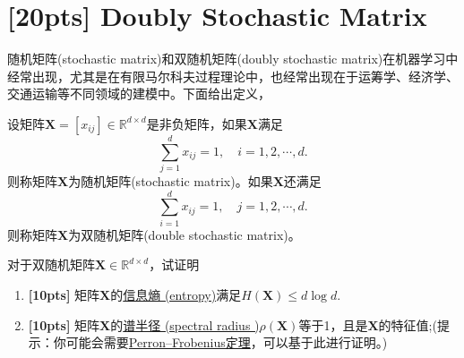 \documentclass[a4paper,UTF8]{article}
\numberwithin{equation}{section}
\begin{document}
\section{[20pts] Doubly Stochastic Matrix}
随机矩阵(stochastic matrix)和双随机矩阵(doubly stochastic matrix)在机器学习中经常出现，尤其是在有限马尔科夫过程理论中，也经常出现在于运筹学、经济学、交通运输等不同领域的建模中。下面给出定义，
\begin{def-box}[随机矩阵]
设矩阵$\mathbf{X}=[x_{ij}]\in \mathbb{R}^{d\times d}$是非负矩阵，如果$\mathbf{X}$满足
\begin{equation}
	\label{eq-sto-matrix}
	\sum_{j=1}^d x_{ij} = 1,\quad i=1,2,\cdots,d.
\end{equation}
则称矩阵$\mathbf{X}$为随机矩阵(stochastic matrix)。如果$\mathbf{X}$还满足
\begin{equation}
	\label{eq-double-sto-matrix}
	\sum_{i=1}^d x_{ij} = 1,\quad j=1,2,\cdots,d.
\end{equation}
则称矩阵$\mathbf{X}$为双随机矩阵(double stochastic matrix)。
\end{def-box}
对于双随机矩阵$\mathbf{X} \in \mathbb{R}^{d\times d}$，试证明
\begin{enumerate}[ {(}1{)}]
\item \textbf{[10pts]} 矩阵$\mathbf{X}$的\href{https://en.wikipedia.org/wiki/Entropy_(information_theory)}{信息熵 (entropy)}满足$H(\mathbf{X}) \leq d\log d$.
\item \textbf{[10pts]} 矩阵$\mathbf{X}$的\href{https://en.wikipedia.org/wiki/Spectral_radius}{谱半径 (spectral radius
)}$\rho(\mathbf{X})$等于1，且是$\mathbf{X}$的特征值;(提示：你可能会需要\href{https://en.wikipedia.org/wiki/Perron%E2%80%93Frobenius_theorem}{Perron–Frobenius定理}，可以基于此进行证明。)
\end{enumerate}
\end{document}
